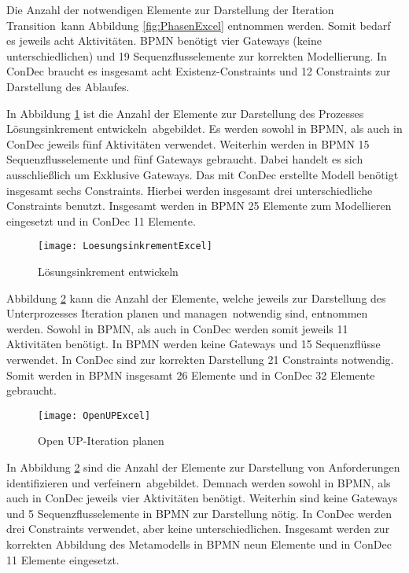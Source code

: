 Die Anzahl der notwendigen Elemente zur Darstellung der Iteration \grqq Transition\grqq \ kann Abbildung \ref{fig:PhasenExcel} entnommen werden. Somit bedarf es jeweils acht Aktivitäten. BPMN benötigt vier Gateways (keine unterschiedlichen) und 19 Sequenzflusselemente zur korrekten Modellierung. In ConDec braucht es insgesamt acht Existenz-Constraints und 12 Constraints zur Darstellung des Ablaufes.\newline


In Abbildung \ref{fig:LoesungsinkrementExcel} ist die Anzahl der Elemente zur Darstellung des Prozesses \grqq Lösungsinkrement entwickeln\grqq \ abgebildet. Es werden sowohl in BPMN, als auch in ConDec jeweils fünf Aktivitäten verwendet. Weiterhin werden in BPMN 15 Sequenzflusselemente und fünf Gateways gebraucht. Dabei handelt es sich ausschließlich um Exklusive Gateways. Das mit ConDec erstellte Modell benötigt insgesamt sechs Constraints. Hierbei werden insgesamt drei unterschiedliche Constraints benutzt. Insgesamt werden in BPMN 25 Elemente zum Modellieren eingesetzt und in ConDec 11 Elemente.\newline

\begin{figure}[htp]
\begin{center}
  \texttt{[image: LoesungsinkrementExcel]} %
  \caption{Lösungsinkrement entwickeln}
  \label{fig:LoesungsinkrementExcel}
\end{center}
\end{figure}


Abbildung \ref{fig:OpenUPExcel} kann die Anzahl der Elemente, welche jeweils zur Darstellung des Unterprozesses \grqq Iteration planen und managen\grqq \ notwendig sind, entnommen werden. Sowohl in BPMN, als auch in ConDec werden somit jeweils 11 Aktivitäten benötigt. In BPMN werden keine Gateways und 15 Sequenzflüsse verwendet. In ConDec sind zur korrekten Darstellung 21 Constraints notwendig. Somit werden in BPMN insgesamt 26 Elemente und in ConDec 32 Elemente gebraucht.\newline

\begin{figure}[htp]
\begin{center}
  \texttt{[image: OpenUPExcel]} %
  \caption{Open UP-Iteration planen}
  \label{fig:OpenUPExcel}
\end{center}
\end{figure}

In Abbildung \ref{fig:OpenUPExcel} sind die Anzahl der Elemente zur Darstellung von \grqq Anforderungen identifizieren und verfeinern\grqq \ abgebildet. Demnach werden sowohl in BPMN, als auch in ConDec jeweils vier Aktivitäten benötigt. Weiterhin sind keine Gateways und 5 Sequenzflusselemente in BPMN zur Darstellung nötig. In ConDec werden drei Constraints verwendet, aber keine unterschiedlichen. Insgesamt werden zur korrekten Abbildung des Metamodells in BPMN neun Elemente und in ConDec 11 Elemente eingesetzt.\newline


